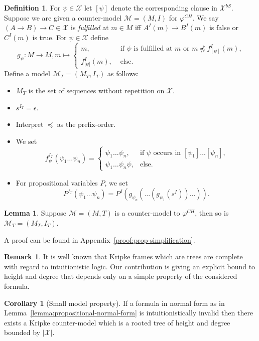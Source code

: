 \documentclass{easychair}
\theoremstyle{definition}
\theoremstyle{definition}
\newtheorem{corollary}[theorem]{Corollary}
\theoremstyle{definition}
\newtheorem{lemma}[theorem]{Lemma}
\theoremstyle{definition}
\theoremstyle{definition}
\newtheorem{definition}[theorem]{Definition}
\theoremstyle{definition}
\theoremstyle{definition}
\newtheorem{remark}[theorem]{Remark}
\begin{document}
\begin{definition}
For $\psi\in\mathcal X$ let $[\psi]$ denote the corresponding clause in $\mathcal X^{b S}$. Suppose we are given a counter-model $\mathcal M = (M, I)$ for $\varphi^{CH}$.
We say $(A\to B)\to C\in\mathcal X$ is \emph{fulfilled} at $m\in M$ iff $A^I(m)\to B^I(m)$ is false or $C^I(m)$ is true. For $\psi\in\mathcal X$ define $$g_\psi : M\to M, m\mapsto\begin{cases}
		m,&\text{ if $\psi$ is fulfilled at $m$ or $m\not\preceq f^I_{[\psi]}(m)$,}\\
		f^I_{\lbrack\psi\rbrack}(m),&\text{ else.}		
	\end{cases}$$Define a model $\mathcal M_T = (M_T, I_T)$ as follows:
	\begin{itemize}\addtolength{\itemsep}{-5pt}
		\item $M_T$ is the set of sequences without repetition on $\mathcal X$.
		\item $s^{I_T} = \epsilon$.
		\item Interpret $\preceq$ as the prefix-order.
		\item We set $$f_\psi^{I_T}(\psi_1\dots\psi_n) = \begin{cases}
			\psi_1\dots\psi_n, &\text{if $\psi$ occurs in $[\psi_1]\dots[\psi_n]$,}\\
			\psi_1\dots\psi_n\psi, &\text{else.}			
		\end{cases}$$
		\item For propositional variables $P$, we set $$P^{I_T}\left(\psi_1\dots \psi_n\right) = P^I\left(g_{\psi_n}\left(\dots\left(g_{\psi_1}\left(s^I\right)\right)\dots\right)\right).$$
	\end{itemize}
\end{definition}

\begin{lemma}
	Suppose $\mathcal M = (M, T)$ is a counter-model to $\varphi^{CH}$, then so is $\mathcal M_T = (M_T, I_T)$.
\end{lemma}

A proof can be found in Appendix~\ref{proof:prop-simplification}.
\begin{remark}
	It is well known that Kripke frames which are trees are complete with regard to intuitionistic logic. Our contribution is giving an explicit bound to height and degree that depends only on a simple property of the considered formula.
\end{remark}

\begin{corollary}[Small model property]
	If a formula in normal form as in Lemma~\ref{lemma:propositional-normal-form} is intuitionistically invalid then there exists a Kripke counter-model which is a rooted tree of height and degree bounded by $|\mathcal X|$.
\end{corollary}
\end{document}
